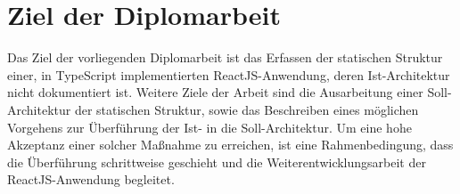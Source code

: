 \section{Ziel der Diplomarbeit}
Das Ziel der vorliegenden Diplomarbeit ist das Erfassen der statischen Struktur einer, in TypeScript implementierten ReactJS-Anwendung, deren Ist-Architektur nicht dokumentiert ist. Weitere Ziele der Arbeit sind die Ausarbeitung einer Soll-Architektur der statischen Struktur, sowie das Beschreiben eines möglichen Vorgehens zur Überführung der Ist- in die Soll-Architektur.
Um eine hohe Akzeptanz einer solcher Maßnahme zu erreichen, ist eine Rahmenbedingung, dass die Überführung schrittweise geschieht und die Weiterentwicklungsarbeit der ReactJS-Anwendung begleitet.
